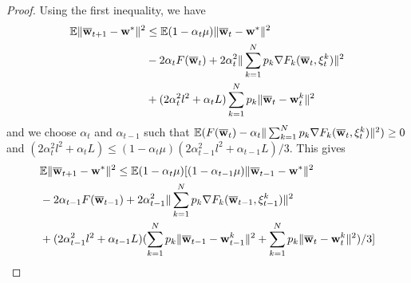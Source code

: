 \begin{proof}
	
	Using the first inequality, we have 
	\begin{align*}
	\mathbb{E}\|{\overline{\mathbf{w}}}_{t+1}-{\mathbf{w}}^{\ast}\|^{2} & \leq\mathbb{E}(1-\alpha_{t}\mu)\|{\overline{\mathbf{w}}}_{t}-{\mathbf{w}}^{\ast}\|^{2}\\
	& -2\alpha_{t}F({\overline{\mathbf{w}}}_{t})+2\alpha_{t}^{2}\|\sum_{k=1}^{N}p_{k}\nabla F_{k}({\overline{\mathbf{w}}}_{t},\xi_{t}^{k})\|^{2}\\
	& +(2\alpha_{t}^{2}l^{2}+\alpha_{t}L)\sum_{k=1}^{N}p_{k}\|{\overline{\mathbf{w}}}_{t}-{\mathbf{w}}_{t}^{k}\|^{2}
	\end{align*}
	and we choose $\alpha_{t}$ and $\alpha_{t-1}$ such that $\mathbb{E}(F({\overline{\mathbf{w}}}_{t})-\alpha_{t}\|\sum_{k=1}^{N}p_{k}\nabla F_{k}({\overline{\mathbf{w}}}_{t},\xi_{t}^{k})\|^{2})\geq0$
	and $(2\alpha_{t}^{2}l^{2}+\alpha_{t}L)\leq(1-\alpha_{t}\mu)(2\alpha_{t-1}^{2}l^{2}+\alpha_{t-1}L)/3$.
	This gives 
	\begin{align*}
	& \mathbb{E}\|{\overline{\mathbf{w}}}_{t+1}-{\mathbf{w}}^{\ast}\|^{2} \leq\mathbb{E}(1-\alpha_{t}\mu)[(1-\alpha_{t-1}\mu)\|{\overline{\mathbf{w}}}_{t-1}-{\mathbf{w}}^{\ast}\|^{2} \\ 
	& -2\alpha_{t-1}F({\overline{\mathbf{w}}}_{t-1}) +2\alpha_{t-1}^{2}\|\sum_{k=1}^{N}p_{k}\nabla F_{k}({\overline{\mathbf{w}}}_{t-1},\xi_{t-1}^{k})\|^{2}\\
	& +(2\alpha_{t-1}^{2}l^{2}+\alpha_{t-1}L)(\sum_{k=1}^{N}p_{k}\|{\overline{\mathbf{w}}}_{t-1}-{\mathbf{w}}_{t-1}^{k}\|^{2}+\sum_{k=1}^{N}p_{k}\|{\overline{\mathbf{w}}}_{t}-{\mathbf{w}}_{t}^{k}\|^{2})/3]
	\end{align*}
	

\end{proof}
